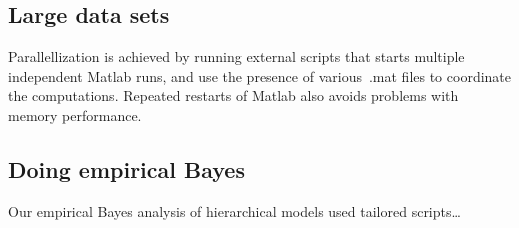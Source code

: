\documentclass[11pt,letterpaper,twocolumn]{article}
\begin{document}
\subsection{Large data sets}
Parallellization is achieved by running external scripts that starts
multiple independent Matlab runs, and use the presence of various~.mat
files to coordinate the computations. Repeated restarts of Matlab also
avoids problems with memory performance.

\subsection{Doing empirical Bayes}
Our empirical Bayes analysis of hierarchical models used tailored
scripts\ldots


\end{document}
